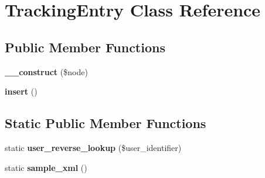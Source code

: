 \hypertarget{class_tracking_entry}{
\section{TrackingEntry Class Reference}
\label{class_tracking_entry}
}
\subsection*{Public Member Functions}
\begin{DoxyCompactItemize}
\item 
\hypertarget{class_tracking_entry_ab854129ae16d4aa9825b59fa03d687bb}{
{\bfseries \_\-\_\-construct} (\$node)}
\label{class_tracking_entry_ab854129ae16d4aa9825b59fa03d687bb}

\item 
\hypertarget{class_tracking_entry_a473241246338cfccc4709ba896749019}{
{\bfseries insert} ()}
\label{class_tracking_entry_a473241246338cfccc4709ba896749019}

\end{DoxyCompactItemize}
\subsection*{Static Public Member Functions}
\begin{DoxyCompactItemize}
\item 
\hypertarget{class_tracking_entry_ab1f6416962448eaf4595318cf690d38b}{
static {\bfseries user\_\-reverse\_\-lookup} (\$user\_\-identifier)}
\label{class_tracking_entry_ab1f6416962448eaf4595318cf690d38b}

\item 
\hypertarget{class_tracking_entry_a724bc8ee7ce6c48ddbe4b39c4fa7564b}{
static {\bfseries sample\_\-xml} ()}
\label{class_tracking_entry_a724bc8ee7ce6c48ddbe4b39c4fa7564b}

\end{DoxyCompactItemize}
